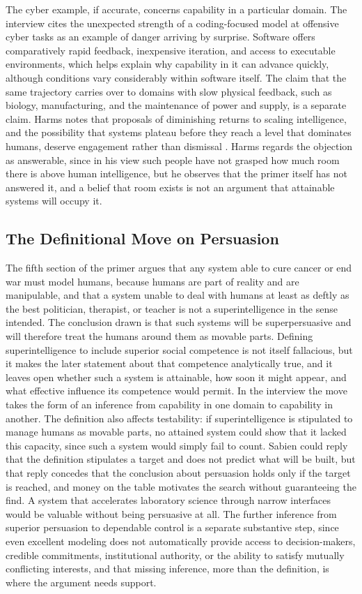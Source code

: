 \documentclass[11pt]{article}
\begin{document}
The cyber example, if accurate, concerns capability in a particular domain. The interview cites the unexpected strength of a coding-focused model at offensive cyber tasks as an example of danger arriving by surprise. Software offers comparatively rapid feedback, inexpensive iteration, and access to executable environments, which helps explain why capability in it can advance quickly, although conditions vary considerably within software itself. The claim that the same trajectory carries over to domains with slow physical feedback, such as biology, manufacturing, and the maintenance of power and supply, is a separate claim. Harms notes that proposals of diminishing returns to scaling intelligence, and the possibility that systems plateau before they reach a level that dominates humans, deserve engagement rather than dismissal \citep{harms2024}. Harms regards the objection as answerable, since in his view such people have not grasped how much room there is above human intelligence, but he observes that the primer itself has not answered it, and a belief that room exists is not an argument that attainable systems will occupy it.

\subsection{The Definitional Move on Persuasion}

The fifth section of the primer argues that any system able to cure cancer or end war must model humans, because humans are part of reality and are manipulable, and that a system unable to deal with humans at least as deftly as the best politician, therapist, or teacher is not a superintelligence in the sense intended. The conclusion drawn is that such systems will be superpersuasive and will therefore treat the humans around them as movable parts. Defining superintelligence to include superior social competence is not itself fallacious, but it makes the later statement about that competence analytically true, and it leaves open whether such a system is attainable, how soon it might appear, and what effective influence its competence would permit. In the interview the move takes the form of an inference from capability in one domain to capability in another. The definition also affects testability: if superintelligence is stipulated to manage humans as movable parts, no attained system could show that it lacked this capacity, since such a system would simply fail to count. Sabien could reply that the definition stipulates a target and does not predict what will be built, but that reply concedes that the conclusion about persuasion holds only if the target is reached, and money on the table motivates the search without guaranteeing the find. A system that accelerates laboratory science through narrow interfaces would be valuable without being persuasive at all. The further inference from superior persuasion to dependable control is a separate substantive step, since even excellent modeling does not automatically provide access to decision-makers, credible commitments, institutional authority, or the ability to satisfy mutually conflicting interests, and that missing inference, more than the definition, is where the argument needs support.
\end{document}
